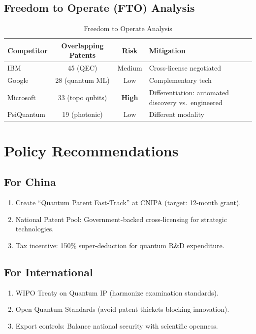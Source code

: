 \documentclass[12pt]{article}
\begin{document}
\subsection{Freedom to Operate (FTO) Analysis}

\begin{table}[ht]
\centering
\caption{Freedom to Operate Analysis}
\label{tab:fto}
\begin{tabular}{lccp{4cm}}
\toprule
Competitor & Overlapping Patents & Risk & Mitigation \\
\midrule
IBM & 45 (QEC) & Medium & Cross-license negotiated \\
Google & 28 (quantum ML) & Low & Complementary tech \\
Microsoft & 33 (topo qubits) & \textbf{High} & Differentiation: automated discovery vs.\ engineered \\
PsiQuantum & 19 (photonic) & Low & Different modality \\
\bottomrule
\end{tabular}
\end{table}

\section{Policy Recommendations}
\label{sec:policy}

\subsection{For China}
\begin{enumerate}
\item Create ``Quantum Patent Fast-Track'' at CNIPA (target: 12-month grant).
\item National Patent Pool: Government-backed cross-licensing for strategic technologies.
\item Tax incentive: 150\% super-deduction for quantum R\&D expenditure.
\end{enumerate}

\subsection{For International}
\begin{enumerate}
\item WIPO Treaty on Quantum IP (harmonize examination standards).
\item Open Quantum Standards (avoid patent thickets blocking innovation).
\item Export controls: Balance national security with scientific openness.
\end{enumerate}
\end{document}
